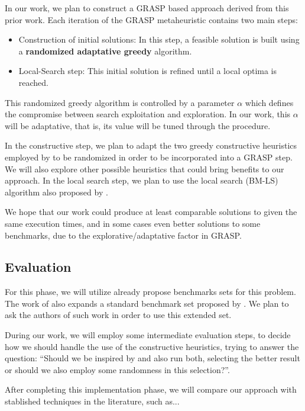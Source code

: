 \documentclass[12pt]{article}
\begin{document}
In our work, we plan to construct a GRASP based approach derived from this prior work. Each iteration of the GRASP metaheuristic contains two main steps:
\begin{itemize}
  \item Construction of initial solutions: In this step, a feasible solution is built using a \textbf{randomized adaptative greedy} algorithm.
  \item Local-Search step: This initial solution is refined until a local optima is reached. 
 \end{itemize}

 This randomized greedy algorithm is controlled by a parameter \(\alpha\) which defines the compromise between search exploitation and exploration. In our work, this \(\alpha\) will be adaptative, that is, its value will be tuned through the procedure.

 In the constructive step, we plan to adapt the two greedy constructive heuristics employed by \cite{kramer:17} to be randomized in order to be incorporated into a GRASP step. We will also explore other possible heuristics that could bring benefits to our approach. In the local search step, we plan to use the local search (BM-LS) algorithm also proposed by \cite{kramer:17}.

 We hope that our work could produce at least comparable solutions to \cite{kramer:17} given the same execution times, and in some cases even better solutions to some benchmarks, due to the explorative/adaptative factor in GRASP.
 
 \subsection{Evaluation}

 For this phase, we will utilize already propose benchmarks sets for this problem. The work of \cite{kramer:17} also expands a standard benchmark set proposed by \cite{otto2013systematic}. We plan to ask the authors of such work in order to use this extended set.

 During our work, we will employ some intermediate evaluation steps, to decide how we should handle the use of the constructive heuristics, trying to answer the question: ``Should we be inspired by \cite{kramer:17} and also run both, selecting the better result or should we also employ some randomness in this selection?''.

 After completing this implementation phase, we will compare our approach with stablished techniques in the literature, such as...
\end{document}
